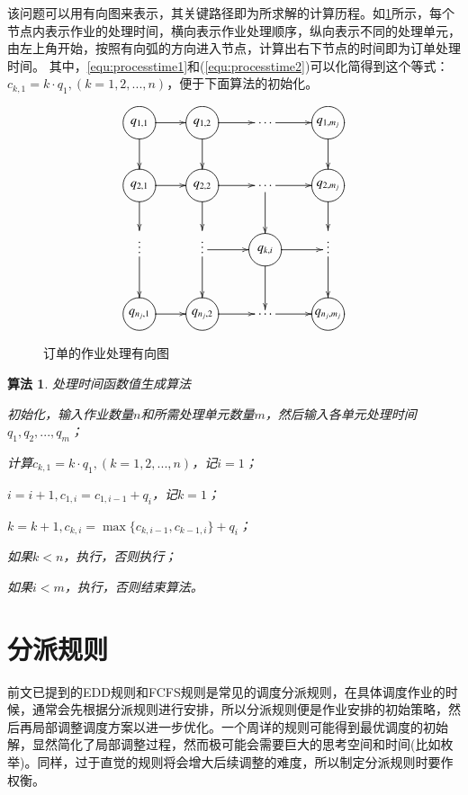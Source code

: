 该问题可以用有向图来表示，其关键路径即为所求解的计算历程。如\ref{fig:directedgraph}所示，每个节点内表示作业的处理时间，横向表示作业处理顺序，纵向表示不同的处理单元，由左上角开始，按照有向弧的方向进入节点，计算出右下节点的时间即为订单处理时间。
其中，\eqref{equ:processtime1}和(\ref{equ:processtime2})可以化简得到这个等式：$c_{k,1} = k\cdot q_1,(k = 1,2,...,n)$，便于下面算法的初始化。
\begin{figure}[h]
\begin{equation*}
\xymatrix{
\process{q_{1,1}} \ar[r] \ar[d] & \process{q_{1,2}} \ar[d] \ar[r] & \cdots\ar[r] & \process{q_{1,m_j}} \ar[d]\\
\process{q_{2,1}} \ar[r]\ar[d] & \process{q_{2,2}} \ar[d]\ar[r] & \cdots \ar[r] \ar[d]& \process{q_{2,m_j}} \ar[d] \\
\vdots\ar[d] & \vdots \ar[d]\ar[r] & \process{q_{k,i}}\ar[r]\ar[d] &\vdots \ar[d]\\
\process{q_{n_j,1}} \ar[r] & \process{q_{n_j,2}} \ar[r] & \cdots\ar[r] & \process{q_{n_j,m_j}}
}
\end{equation*}
\caption{订单的作业处理有向图\label{fig:directedgraph}}
\end{figure}

\theoremheaderfont{\heiti}
\newtheorem{algori}[algor]{算法}%
\begin{algori}
处理时间函数值生成算法\label{alg:processtime}

\begin{asparaenum}
\renewcommand{\labelenumi}{\bf Step\theenumi~}
\item 初始化，输入作业数量$n$和所需处理单元数量$m$，然后输入各单元处理时间$q_1,q_2,...,q_m$；
\item 计算$c_{k,1} = k\cdot q_1,(k = 1,2,...,n)$，记$i = 1$；
\item $i = i + 1, c_{1,i} = c_{1,i-1} + q_i$，记$k = 1$；
\item $k = k + 1, c_{k,i} = \max\{c_{k,i-1}, c_{k-1,i}\} + q_i$；
\item 如果$k<n$，执行，否则执行；
\item 如果$i<m$，执行，否则结束算法。
\end{asparaenum}
\end{algori}

\section{分派规则}
前文已提到的EDD规则和FCFS规则是常见的调度分派规则，在具体调度作业的时候，通常会先根据分派规则进行安排，所以分派规则便是作业安排的初始策略，然后再局部调整调度方案以进一步优化。一个周详的规则可能得到最优调度的初始解，显然简化了局部调整过程，然而极可能会需要巨大的思考空间和时间(比如枚举)。同样，过于直觉的规则将会增大后续调整的难度，所以制定分派规则时要作权衡。
